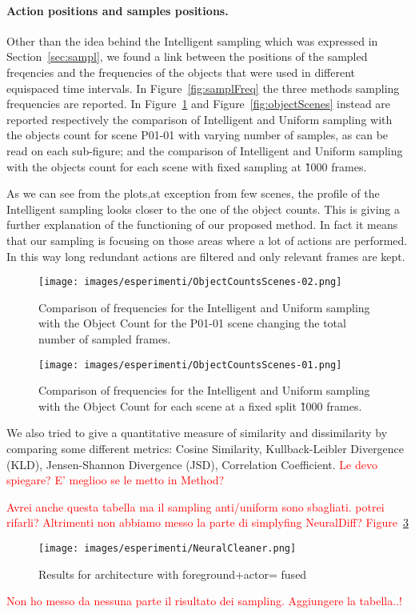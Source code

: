 \paragraph{Action positions and samples positions.} Other than the idea behind the Intelligent sampling which was expressed in Section~\ref{sec:sampl}, we found a
link between the positions of the sampled freqencies and the frequencies of the objects that were used in different 
equispaced time intervals. In Figure~\ref{fig:samplFreq} the three methods sampling 
frequencies are reported. In Figure~\ref{fig:objectP01_01} and Figure~\ref{fig:objectScenes} instead are reported respectively
the comparison of Intelligent and Uniform sampling with the objects count for scene P01-01 with varying number of samples,
as can be read on each sub-figure; and the comparison of Intelligent and Uniform sampling with the objects count for each scene
with fixed sampling at \~1000 frames.

As we can see from the plots,at exception from few scenes, the profile of the Intelligent sampling looks closer
to the one of the object counts. This is giving a further explanation of the functioning of our proposed method.
In fact it means that our sampling is focusing on those areas where a lot of actions are performed. In this way
long redundant actions are filtered and only relevant frames are kept. 

\begin{figure}
    \centering
    \texttt{[image: images/esperimenti/ObjectCountsScenes-02.png]} 
    \caption{Comparison of frequencies for the Intelligent and Uniform sampling with the Object Count for the P01-01 scene changing the total
    number of sampled frames.}\label{fig:objectP01_01}
\end{figure}

\begin{figure}
    \centering
    \texttt{[image: images/esperimenti/ObjectCountsScenes-01.png]} 
    \caption{Comparison of frequencies for the Intelligent and Uniform sampling with the Object Count for each scene at a fixed split \~1000 frames.}\label{fig:objectsScenes}
\end{figure}

We also tried to give a quantitative measure of similarity and dissimilarity by comparing some different metrics: Cosine Similarity, Kullback-Leibler Divergence (KLD),
Jensen-Shannon Divergence (JSD), Correlation Coefficient. \textcolor{red}{Le devo spiegare? E' meglioo se le metto in Method?}


\textcolor{red}{Avrei anche questa tabella ma il sampling anti/uniform sono sbagliati.
potrei rifarli? Altrimenti non abbiamo messo la parte di simplyfing NeuralDiff? Figure~\ref{fig:NeuralCleaner}}
\begin{figure}
    \centering
    \texttt{[image: images/esperimenti/NeuralCleaner.png]} 
    \caption{Results for architecture with foreground+actor= fused}\label{fig:NeuralCleaner}
\end{figure}

\textcolor{red}{Non ho messo da nessuna parte il risultato dei sampling. Aggiungere la tabella..!}